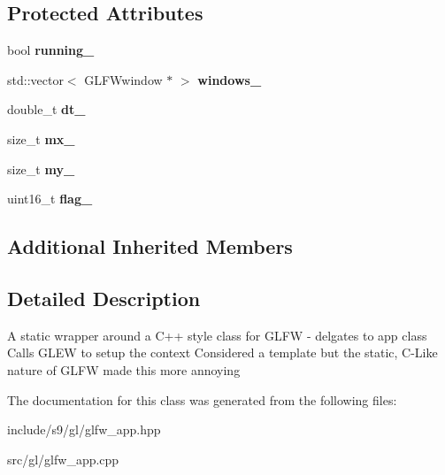 \subsection*{Protected Attributes}
\begin{DoxyCompactItemize}
\item 
\hypertarget{classs9_1_1gl_1_1GLFWApp_aed2a0d772c56e7ffdedf8d5eddd157bf}{bool {\bfseries running\-\_\-}}\label{classs9_1_1gl_1_1GLFWApp_aed2a0d772c56e7ffdedf8d5eddd157bf}

\item 
\hypertarget{classs9_1_1gl_1_1GLFWApp_a72ad3e0eb17c0a522c4023934dee81a4}{std\-::vector$<$ G\-L\-F\-Wwindow $\ast$ $>$ {\bfseries windows\-\_\-}}\label{classs9_1_1gl_1_1GLFWApp_a72ad3e0eb17c0a522c4023934dee81a4}

\item 
\hypertarget{classs9_1_1gl_1_1GLFWApp_a1c478d7892232e2e3395f925fbc9a842}{double\-\_\-t {\bfseries dt\-\_\-}}\label{classs9_1_1gl_1_1GLFWApp_a1c478d7892232e2e3395f925fbc9a842}

\item 
\hypertarget{classs9_1_1gl_1_1GLFWApp_a162114e838ccfd5b3f5a840992ff32d9}{size\-\_\-t {\bfseries mx\-\_\-}}\label{classs9_1_1gl_1_1GLFWApp_a162114e838ccfd5b3f5a840992ff32d9}

\item 
\hypertarget{classs9_1_1gl_1_1GLFWApp_a23f7e95cfbb96fbc77fa360dde26ca35}{size\-\_\-t {\bfseries my\-\_\-}}\label{classs9_1_1gl_1_1GLFWApp_a23f7e95cfbb96fbc77fa360dde26ca35}

\item 
\hypertarget{classs9_1_1gl_1_1GLFWApp_a5b23726188fde50271b9847fe811399c}{uint16\-\_\-t {\bfseries flag\-\_\-}}\label{classs9_1_1gl_1_1GLFWApp_a5b23726188fde50271b9847fe811399c}

\end{DoxyCompactItemize}
\subsection*{Additional Inherited Members}


\subsection{Detailed Description}
A static wrapper around a C++ style class for G\-L\-F\-W -\/ delgates to app class Calls G\-L\-E\-W to setup the context Considered a template but the static, C-\/\-Like nature of G\-L\-F\-W made this more annoying 

The documentation for this class was generated from the following files\-:\begin{DoxyCompactItemize}
\item 
include/s9/gl/glfw\-\_\-app.\-hpp\item 
src/gl/glfw\-\_\-app.\-cpp\end{DoxyCompactItemize}
